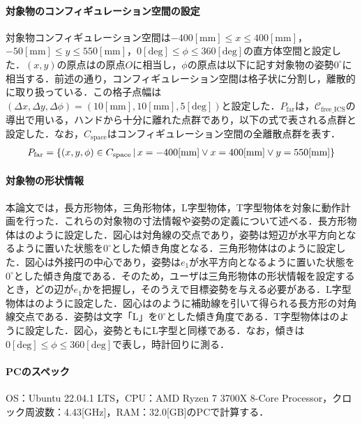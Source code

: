 \documentclass[a4paper,twoside,12pt,papersize, dvipdfmx]{iirthesis}
\begin{document}
\paragraph{対象物のコンフィギュレーション空間の設定}
対象物コンフィギュレーション空間は$-400 \mathrm{[mm]} \leq x \leq 400 \mathrm{[mm]}$，$-50 \mathrm{[mm]} \leq y \leq 550 \mathrm{[mm]}$，$0 \mathrm{[deg]} \leq \phi \leq 360 \mathrm{[deg]}$の直方体空間と設定した．$(x,y)$の原点はの原点$O$に相当し，$\phi$の原点は以下に記す対象物の姿勢$0^\circ$に相当する．前述の通り，コンフィギュレーション空間は格子状に分割し，離散的に取り扱っている．この格子点幅は$(\Delta x, \Delta y, \Delta \phi) = (10 \mathrm{[mm]}, 10 \mathrm{[mm]}, 5 \mathrm{[deg]})$と設定した．$P_{\mathrm {far}}$は，$\mathcal{C}_{\mathrm{free\_ICS}}$の導出で用いる，ハンドから十分に離れた点群であり，以下の式で表される点群と設定した．なお，$C_{\mathrm {space}}$はコンフィギュレーション空間の全離散点群を表す．
\begin{gather}
\notag
P_{\mathrm {far}} = \{ (x, y, \phi) \in C_{\mathrm {space}} \,|\, x = -400 \mathrm{[mm]} \lor x = 400 \mathrm{[mm]} \lor y = 550\mathrm{[mm]} \}
\end{gather}

\paragraph{対象物の形状情報}
本論文では，長方形物体，三角形物体，L字型物体，T字型物体を対象に動作計画を行った．これらの対象物の寸法情報や姿勢の定義について述べる．長方形物体は\figref{}のように設定した．図心は対角線の交点であり，姿勢は短辺が水平方向となるように置いた状態を$0^\circ$とした傾き角度となる．三角形物体は\figref{}のように設定した．図心は外接円の中心であり，姿勢は$e_1$が水平方向となるように置いた状態を$0^\circ$とした傾き角度である．そのため，ユーザは三角形物体の形状情報を設定するとき，どの辺が$e_1$かを把握し，そのうえで目標姿勢を与える必要がある．L字型物体は\figref{}のように設定した．図心は\figref{}のように補助線を引いて得られる長方形の対角線交点である．姿勢は文字「L」を$0^\circ$とした傾き角度である．T字型物体は\figref{}のように設定した．図心，姿勢ともにL字型と同様である．なお，傾きは$0 \mathrm{[deg]} \leq \phi \leq 360 \mathrm{[deg]}$で表し，時計回りに測る．

\paragraph{PCのスペック}
OS：Ubuntu 22.04.1 LTS，CPU：AMD Ryzen 7 3700X 8-Core Processor，クロック周波数：4.43[GHz]，RAM：32.0[GB]のPCで計算する．
\end{document}

